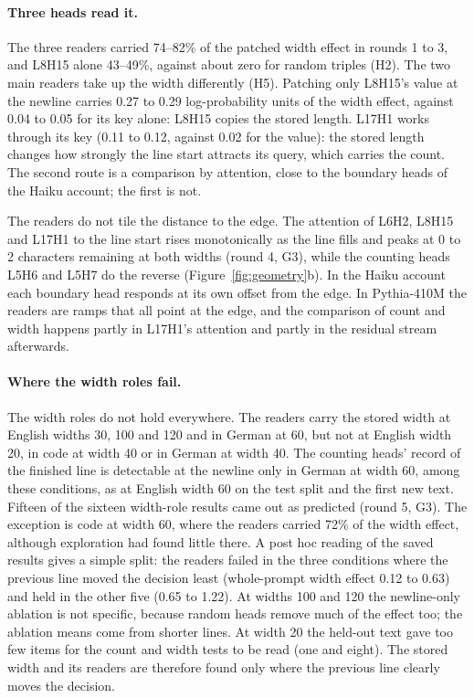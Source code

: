 \documentclass[11pt,a4paper]{article}
\begin{document}
\paragraph{Three heads read it.}
The three readers carried 74--82\% of the patched width effect in rounds 1 to 3, and L8H15 alone 43--49\%, against about zero for random triples (H2). The two main readers take up the width differently (H5). Patching only L8H15's value at the newline carries 0.27 to 0.29 log-probability units of the width effect, against 0.04 to 0.05 for its key alone: L8H15 copies the stored length. L17H1 works through its key (0.11 to 0.12, against 0.02 for the value): the stored length changes how strongly the line start attracts its query, which carries the count. The second route is a comparison by attention, close to the boundary heads of the Haiku account; the first is not.

The readers do not tile the distance to the edge. The attention of L6H2, L8H15 and L17H1 to the line start rises monotonically as the line fills and peaks at 0 to 2 characters remaining at both widths (round 4, G3), while the counting heads L5H6 and L5H7 do the reverse (Figure~\ref{fig:geometry}b). In the Haiku account each boundary head responds at its own offset from the edge. In Pythia-410M the readers are ramps that all point at the edge, and the comparison of count and width happens partly in L17H1's attention and partly in the residual stream afterwards.

\paragraph{Where the width roles fail.}
The width roles do not hold everywhere. The readers carry the stored width at English widths 30, 100 and 120 and in German at 60, but not at English width 20, in code at width 40 or in German at width 40. The counting heads' record of the finished line is detectable at the newline only in German at width 60, among these conditions, as at English width 60 on the test split and the first new text. Fifteen of the sixteen width-role results came out as predicted (round 5, G3). The exception is code at width 60, where the readers carried 72\% of the width effect, although exploration had found little there. A post hoc reading of the saved results gives a simple split: the readers failed in the three conditions where the previous line moved the decision least (whole-prompt width effect 0.12 to 0.63) and held in the other five (0.65 to 1.22). At widths 100 and 120 the newline-only ablation is not specific, because random heads remove much of the effect too; the ablation means come from shorter lines. At width 20 the held-out text gave too few items for the count and width tests to be read (one and eight). The stored width and its readers are therefore found only where the previous line clearly moves the decision.
\end{document}
